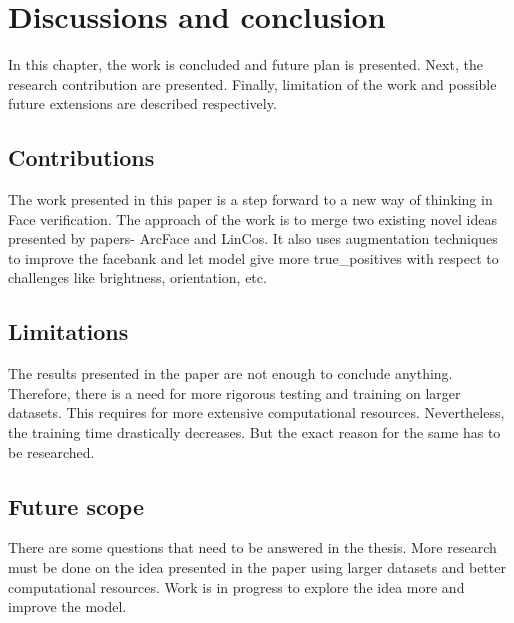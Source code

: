\chapter{Discussions and conclusion}
In this chapter, the work is concluded and future plan is presented. Next, the research contribution
are presented. Finally, limitation of the work and possible future extensions are
described respectively.

\section{Contributions}
The work presented in this paper is a step forward to a new way of thinking in Face verification. The approach of the work is to merge two existing novel ideas presented by papers- ArcFace and LinCos. It also uses augmentation techniques to improve the facebank and let model give more true\_positives with respect to challenges like brightness, orientation, etc.
\section{Limitations}
The results presented in the paper are not enough to conclude anything. Therefore, there is a need for more rigorous testing and training on larger datasets. This requires for more extensive computational resources. Nevertheless, the training time drastically decreases. But the exact reason for the same has to be researched.
\section{Future scope}
There are some questions that need to be answered in the thesis. More research must be done on the idea presented in the paper using larger datasets and better computational resources. Work is in progress to explore the idea more and improve the model.
